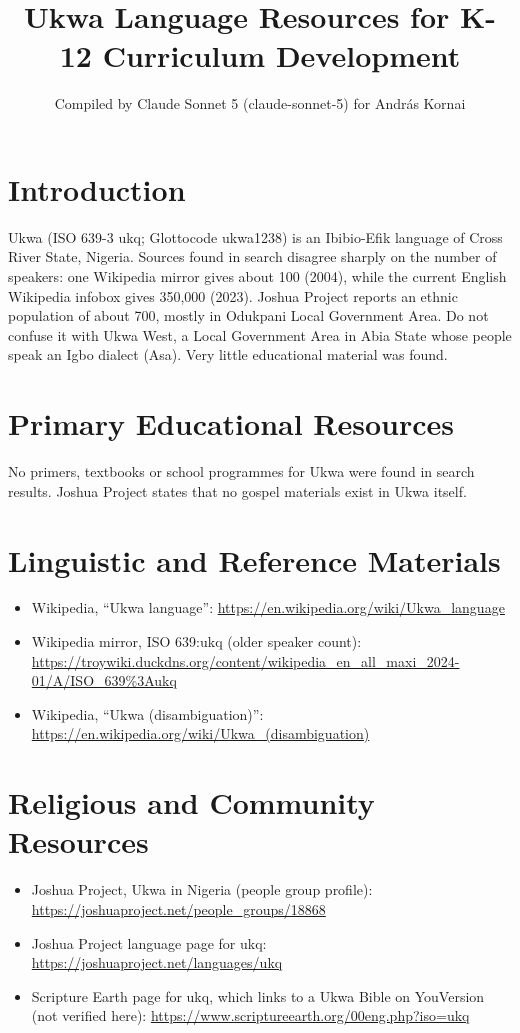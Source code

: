 \documentclass[12pt]{article}
\title{Ukwa Language Resources for K-12 Curriculum Development}
\author{Compiled by Claude Sonnet 5 (claude-sonnet-5) for Andr\'as Kornai}
\date{}
\begin{document}
\maketitle

\section{Introduction}
Ukwa (ISO 639-3 ukq; Glottocode ukwa1238) is an Ibibio-Efik language of Cross River State, Nigeria. Sources found in search disagree sharply on the number of speakers: one Wikipedia mirror gives about 100 (2004), while the current English Wikipedia infobox gives 350,000 (2023). Joshua Project reports an ethnic population of about 700, mostly in Odukpani Local Government Area. Do not confuse it with Ukwa West, a Local Government Area in Abia State whose people speak an Igbo dialect (Asa). Very little educational material was found.

\section{Primary Educational Resources}
No primers, textbooks or school programmes for Ukwa were found in search results. Joshua Project states that no gospel materials exist in Ukwa itself.

\section{Linguistic and Reference Materials}
\begin{itemize}
\item Wikipedia, ``Ukwa language'': \url{https://en.wikipedia.org/wiki/Ukwa_language}
\item Wikipedia mirror, ISO 639:ukq (older speaker count): \url{https://troywiki.duckdns.org/content/wikipedia_en_all_maxi_2024-01/A/ISO_639%3Aukq}
\item Wikipedia, ``Ukwa (disambiguation)'': \url{https://en.wikipedia.org/wiki/Ukwa_(disambiguation)}
\end{itemize}

\section{Religious and Community Resources}
\begin{itemize}
\item Joshua Project, Ukwa in Nigeria (people group profile): \url{https://joshuaproject.net/people_groups/18868}
\item Joshua Project language page for ukq: \url{https://joshuaproject.net/languages/ukq}
\item Scripture Earth page for ukq, which links to a Ukwa Bible on YouVersion (not verified here): \url{https://www.scriptureearth.org/00eng.php?iso=ukq}
\end{itemize}
\end{document}
